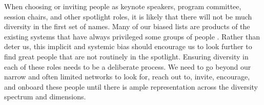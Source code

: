 \documentclass[10pt,letterpaper]{article}
\begin{document}

When choosing or inviting people as keynote speakers, program committee, session chairs, and other spotlight roles, it is likely that there will not be much diversity in the first set of names. Many of our biased lists are products of the existing systems that have always privileged some groups of people \cite{dwyerNoticeWhoScience2021,swartzScienceValueDiversity2019,wongBuildDiversityScience2020,dignazioUnicornsJanitorsNinjas2020}. Rather than deter us, this implicit and systemic bias should encourage us to look further to find great people that are not routinely in the spotlight. 
Ensuring diversity in each of these roles needs to be a deliberate process. We need to go beyond our narrow and often limited networks to look for, reach out to, invite, encourage, and onboard these people until there is ample representation across the diversity spectrum and dimensions. 
\end{document}
